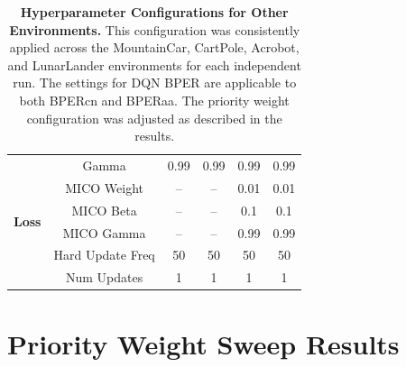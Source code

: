 \begin{table}[H]
\begin{tabular}{@{} lccccc @{}}
\multirow{6}{*}{\textbf{Loss}} 
& Gamma & 0.99 & 0.99 & 0.99 & 0.99 \\ 
& MICO Weight & -- & -- & 0.01 & 0.01 \\ 
& MICO Beta & -- & -- & 0.1 & 0.1 \\ 
& MICO Gamma & -- & -- & 0.99 & 0.99 \\ 
& Hard Update Freq & 50 & 50 & 50 & 50 \\ 
& Num Updates & 1 & 1 & 1 & 1 \\ 
\bottomrule

\end{tabular}
\caption[Hyperparameter Configurations for Other Environments]{\textbf{Hyperparameter Configurations for Other Environments.} This configuration was consistently applied across the MountainCar, CartPole, Acrobot, and LunarLander environments for each independent run. The settings for DQN BPER are applicable to both BPERcn and BPERaa. The priority weight configuration was adjusted as described in the results.}
\end{table}


\section{Priority Weight Sweep Results}
\label{append:priority_weight_sweep}

